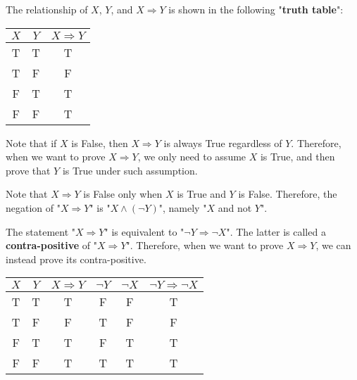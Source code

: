 \documentclass[main.tex]{subfiles}
\begin{document}
\begin{remark} The relationship of $X$, $Y$, and $X \Rightarrow Y$ is shown in the following "\textbf{truth table}":
    \begin{center}
    \begin{tabular}{c|c|c}
         $X$ & $Y$ & $X \Rightarrow Y$  \\
         \hline
         T & T & T \\
         T & F & F \\
         F & T & T \\
         F & F & T
    \end{tabular}
    \end{center}
\end{remark}

\begin{remark}
    Note that if $X$ is False, then $X \Rightarrow Y$ is always True regardless of $Y$. Therefore, when we want to prove $X \Rightarrow Y$, we only need to assume $X$ is True, and then prove that $Y$ is True under such assumption.\\
\end{remark}

\begin{remark}
    Note that $X \Rightarrow Y$ is False only when $X$ is True and $Y$ is False. Therefore, the negation of "$X \Rightarrow Y$" is "$X \wedge (\neg Y)$", namely "$X$ and not $Y$".\\
\end{remark}
    
\begin{remark}
    The statement "$X \Rightarrow Y$" is equivalent to "$\neg Y \Rightarrow \neg X$". The latter is called a \textbf{contra-positive} of "$X \Rightarrow Y$". Therefore, when we want to prove $X \Rightarrow Y$, we can instead prove its contra-positive.
    \begin{center}
    \begin{tabular}{c|c|c|c|c|c}
         $X$ & $Y$ & $X \Rightarrow Y$ & $\neg Y$ & $\neg X$ & $\neg Y \Rightarrow \neg X$ \\
         \hline
         T & T & T & F & F & T\\
         T & F & F & T & F & F\\
         F & T & T & F & T & T\\
         F & F & T & T & T & T
    \end{tabular}
    \end{center}
\end{remark}
\end{document}
